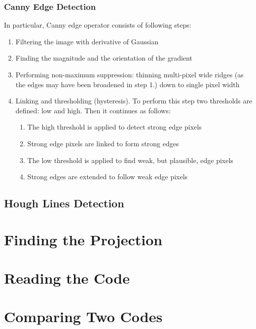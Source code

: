 \subsubsection{Canny Edge Detection}
In particular, Canny edge operator consists of following steps\cite{canny-edge}:
\begin{enumerate}
	\item Filtering the image with derivative of Gaussian
	\item Finding the magnitude and the orientation of the gradient
	\item Performing non-maximum suppression: thinning multi-pixel wide ridges (as the edges may have been broadened in step 1.) down to single pixel width
	\item Linking and thresholding (hysteresis). To perform this step two thresholds are defined: low and high. Then it continues as follows:
	\begin{enumerate}
		\item The high threshold is applied to detect strong edge pixels
		\item Strong edge pixels are linked to form strong edges
		\item The low threshold is applied to find weak, but plausible, edge pixels
		\item Strong edges are extended to follow weak edge pixels
	\end{enumerate}
\end{enumerate}

\subsection{Hough Lines Detection}

\section{Finding the Projection}

\section{Reading the Code}

\section{Comparing Two Codes}